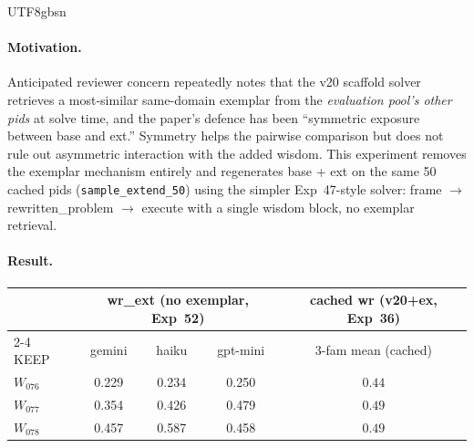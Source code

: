 \documentclass{article}
\begin{document}
\begin{CJK*}{UTF8}{gbsn}
\paragraph{Motivation.} Anticipated reviewer concern repeatedly notes
that the v20 scaffold solver retrieves a most-similar same-domain
exemplar from the \emph{evaluation pool's other pids} at solve
time, and the paper's defence has been ``symmetric exposure
between base and ext.'' Symmetry helps the pairwise comparison
but does not rule out asymmetric interaction with the added
wisdom. This experiment removes the exemplar mechanism entirely
and regenerates base + ext on the same 50 cached pids
(\texttt{sample\_extend\_50}) using the simpler Exp~47-style
solver: frame \(\to\) rewritten\_problem \(\to\) execute with a
single wisdom block, no exemplar retrieval.

\paragraph{Result.}

\begin{center}\small
\begin{tabular}{l c c c c}
  \toprule
  & \multicolumn{3}{c}{wr\_ext (no exemplar, Exp~52)} & cached wr (v20+ex, Exp~36) \\
  \cmidrule(lr){2-4}
  KEEP & gemini & haiku & gpt-mini & 3-fam mean (cached) \\
  \midrule
  \(W_{076}\) & 0.229 & 0.234 & 0.250 & \(\mathbf{0.44}\) \\
  \(W_{077}\) & 0.354 & 0.426 & 0.479 & \(\mathbf{0.49}\) \\
  \(W_{078}\) & 0.457 & 0.587 & 0.458 & \(\mathbf{0.49}\) \\
  \bottomrule
\end{tabular}
\end{center}


\end{CJK*}
\end{document}
